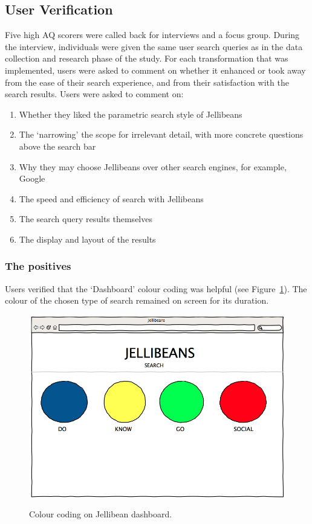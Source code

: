 \documentclass[a4paper, 11pt]{article}
\begin{document}
\subsection{User Verification}
Five high AQ scorers were called back for interviews and a focus group. During the interview, individuals were given the same user search queries as in the data collection and research phase of the study. For each transformation that was implemented, users were asked to comment on whether it enhanced or took away from the ease of their search experience, and from their satisfaction with the search results. Users were asked to comment on:
\begin{enumerate}
\item{Whether they liked the parametric search style of Jellibeans}
\item{The `narrowing' the scope for irrelevant detail, with more concrete questions above the search bar}
\item{Why they may choose Jellibeans over other search engines, for example, Google}
\item{The speed and efficiency of search with Jellibeans}
\item{The search query results themselves}
\item{The display and layout of the results}
\end{enumerate}

\subsubsection{The positives}
Users verified that the `Dashboard' colour coding was helpful (see Figure~\ref{colourCoding}). The colour of the chosen type of search remained on screen for its duration.

\begin{figure}[H]
\begin{center}
\includegraphics[scale=0.25]{DoKnowGoSocial}\\
\caption{Colour coding on Jellibean dashboard.}
\label{colourCoding}
\end{center}
\end{figure}
\end{document}
